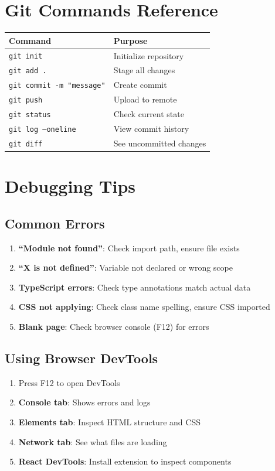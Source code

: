 \documentclass[12pt,a4paper]{article}
\begin{document}
\section{Git Commands Reference}

\begin{tabular}{|l|l|}
\hline
\textbf{Command} & \textbf{Purpose} \\
\hline
\texttt{git init} & Initialize repository \\
\texttt{git add .} & Stage all changes \\
\texttt{git commit -m "message"} & Create commit \\
\texttt{git push} & Upload to remote \\
\texttt{git status} & Check current state \\
\texttt{git log --oneline} & View commit history \\
\texttt{git diff} & See uncommitted changes \\
\hline
\end{tabular}

\section{Debugging Tips}

\subsection{Common Errors}

\begin{enumerate}
    \item \textbf{``Module not found''}: Check import path, ensure file exists
    \item \textbf{``X is not defined''}: Variable not declared or wrong scope
    \item \textbf{TypeScript errors}: Check type annotations match actual data
    \item \textbf{CSS not applying}: Check class name spelling, ensure CSS imported
    \item \textbf{Blank page}: Check browser console (F12) for errors
\end{enumerate}

\subsection{Using Browser DevTools}

\begin{enumerate}
    \item Press F12 to open DevTools
    \item \textbf{Console tab}: Shows errors and logs
    \item \textbf{Elements tab}: Inspect HTML structure and CSS
    \item \textbf{Network tab}: See what files are loading
    \item \textbf{React DevTools}: Install extension to inspect components
\end{enumerate}
\end{document}

